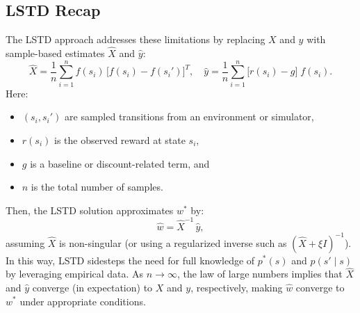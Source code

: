 \subsection{LSTD Recap}
The LSTD approach addresses these limitations by replacing $X$ and $y$ with sample-based estimates $\widehat{X}$ and $\widehat{y}$:
\[
\widehat{X} 
= \frac{1}{n} \sum_{i=1}^n f(s_i)\,\bigl[f(s_i) - f(s_i')\bigr]^T,
\quad
\widehat{y} 
= \frac{1}{n} \sum_{i=1}^n \bigl[r(s_i) - g\bigr]\; f(s_i).
\]
Here:
\begin{itemize}
    \item $(s_i, s_i')$ are sampled transitions from an environment or simulator,
    \item $r(s_i)$ is the observed reward at state $s_i$,
    \item $g$ is a baseline or discount-related term, and
    \item $n$ is the total number of samples.
\end{itemize}
Then, the LSTD solution approximates $w^*$ by:
\[
\widehat{w}
= \widehat{X}^{-1}\,\widehat{y},
\]
assuming $\widehat{X}$ is non-singular (or using a regularized inverse such as $(\widehat{X} + \xi I)^{-1}$). In this way, LSTD sidesteps the need for full knowledge of $p^*(s)$ and $p(s'\mid s)$ by leveraging empirical data. As $n \to \infty$, the law of large numbers implies that $\widehat{X}$ and $\widehat{y}$ converge (in expectation) to $X$ and $y$, respectively, making $\widehat{w}$ converge to $w^*$ under appropriate conditions.

